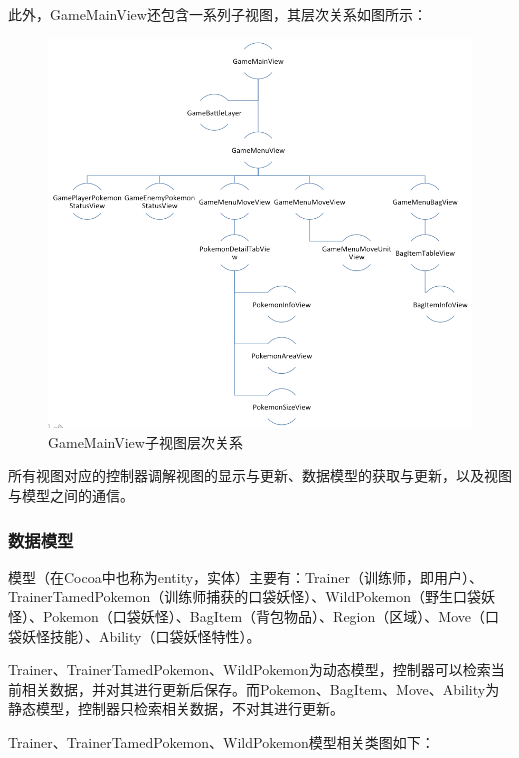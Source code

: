 \documentclass{article}
\begin{document}
\begin{CJK}{UTF8}{gbsn}
  此外，GameMainView还包含一系列子视图，其层次关系如图所示：

  \begin{figure}[htbp]
		\centering
		\includegraphics[bb=0 0 803 738, scale=0.45]{figure/fig_n11.png}
		\caption{GameMainView子视图层次关系}
		\label{fig:n11}
	\end{figure}

  所有视图对应的控制器调解视图的显示与更新、数据模型的获取与更新，以及视图与模型之间的通信。

	\subsubsection{数据模型}
  模型（在Cocoa中也称为entity，实体）主要有：Trainer（训练师，即用户）、TrainerTamedPokemon（训练师捕获的口袋妖怪）、WildPokemon（野生口袋妖怪）、Pokemon（口袋妖怪）、BagItem（背包物品）、Region（区域）、Move（口袋妖怪技能）、Ability（口袋妖怪特性）。

  Trainer、TrainerTamedPokemon、WildPokemon为动态模型，控制器可以检索当前相关数据，并对其进行更新后保存。而Pokemon、BagItem、Move、Ability为静态模型，控制器只检索相关数据，不对其进行更新。

  Trainer、TrainerTamedPokemon、WildPokemon模型相关类图如下：


\end{CJK}
\end{document}
